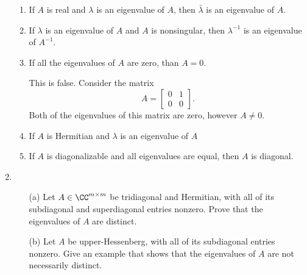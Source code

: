 \documentclass[11pt]{article}
\begin{document}
\begin{enumerate}
\begin{enumerate}
            \item
                If $A$ is real and $\lambda$ is an eigenvalue of $A$, then
                $\bar{\lambda}$ is an eigenvalue of $A$.

            \item
                If $\lambda$ is an eigenvalue of $A$ and $A$ is nonsingular, then
                $\lambda^{-1}$ is an eigenvalue of $A^{-1}$.

            \item %
                If all the eigenvalues of $A$ are zero, than $A = 0$.

                This is false.
                Consider the matrix
                \[
                    A =
                    \begin{bmatrix}
                        0 & 1 \\
                        0 & 0
                    \end{bmatrix}.
                \]
                Both of the eigenvalues of this matrix are zero, however
                $A \neq 0$.

            \item
                If $A$ is Hermitian and $\lambda$ is an eigenvalue of $A$

            \item
                If $A$ is diagonalizable and all eigenvalues are equal, then $A$
                is diagonal.
        \end{enumerate}

    \item %
        \begin{enumerate}
            \item[(a)]
                Let $A \in \CC^{m \times m}$ be tridiagonal and Hermitian, with
                all of its subdiagonal and superdiagonal entries nonzero.
                Prove that the eigenvalues of $A$ are distinct.


            \item[(b)]
                Let $A$ be upper-Hessenberg, with all of its subdiagonal entries
                nonzero.
                Give an example that shows that the eigenvalues of $A$ are
                not necessarily distinct.
        \end{enumerate}


\end{enumerate}
\end{document}
